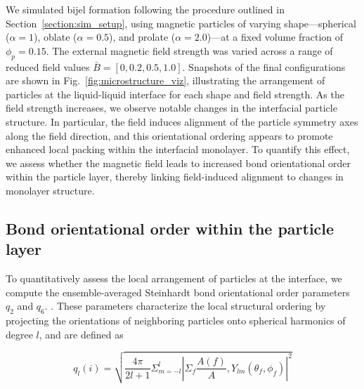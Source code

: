 We simulated bijel formation following the procedure outlined in Section~\ref{section:sim_setup}, using magnetic particles of varying shape—spherical (\(\alpha = 1\)), oblate (\(\alpha = 0.5\)), 
and prolate (\(\alpha = 2.0\))—at a fixed volume fraction of \(\phi_p = 0.15\). The external magnetic field strength was varied across a range of reduced field values \(\bar{B} = [0, 0.2, 0.5, 1.0]\). 
Snapshots of the final configurations are shown in Fig.~\ref{fig:microstructure_viz}, illustrating the arrangement of particles at the liquid-liquid interface for each shape and field strength. As the 
field strength increases, we observe notable changes in the interfacial particle structure. In particular, the field induces alignment of the particle symmetry axes along the field direction, and this 
orientational ordering appears to promote enhanced local packing within the interfacial monolayer. To quantify this effect, we assess whether the magnetic field leads to increased bond orientational 
order within the particle layer, thereby linking field-induced alignment to changes in monolayer structure.

\subsection{Bond orientational order within the particle layer}

To quantitatively assess the local arrangement of particles at the interface, we compute the ensemble-averaged Steinhardt bond orientational order parameters $q_2$ and $q_6$.
\cite{steinhardt_bond-orientational_1983, lechner_accurate_2008, mickel_shortcomings_2013}. These parameters characterize the local structural ordering by projecting the orientations of neighboring particles 
onto spherical harmonics of degree \(l\), and are defined as


\begin{equation}
q_l(i) = \sqrt{ \frac{4 \pi}{2l + 1} \Sigma_{m = -l}^{l} | \Sigma_{f} \frac{A(f)}{A}, Y_{lm}(\theta_f, \phi_f) |^2 }
\label{eq:steinhardt_definition}
\end{equation} 

